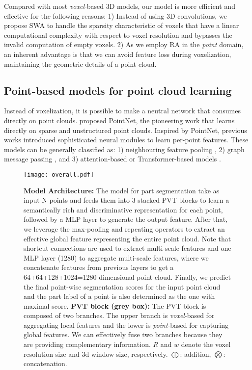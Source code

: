 \documentclass[10pt,twocolumn,letterpaper]{article}
\begin{document}
Compared with most \emph{voxel}-based 3D models, our model is more efficient and effective for the following reasons: 1) Instead of using 3D convolutions, we propose SWA to handle the sparsity characteristic of voxels that have a linear computational complexity with respect to voxel resolution and bypasses the invalid computation of empty voxels. 2) As we employ RA in the \emph{point} domain, an inherent advantage is that we can avoid feature loss during voxelization, maintaining the geometric details of a point cloud.
\subsection{Point-based models for point cloud learning}

Instead of voxelization, it is possible to make a neutral network that consumes directly on point clouds. \cite{qi2017pointnet} proposed PointNet, the pioneering work that learns directly on sparse and unstructured point clouds.
Inspired by PointNet, previous works introduced sophisticated neural modules to learn per-point features. These models can be generally classified as: 1) neighbouring feature pooling \cite{2019PointWeb,2018Recurrent}, 2) graph message passing \cite{2018Dynamic,2019Linked,2019Graph}, and 3) attention-based or Transformer-based models \cite{2021Semantic,2019PCAN,2019Learning,guo2020pct,zhao2020point,Nico}. 
\begin{figure*}
    \centering
    \texttt{[image: overall.pdf]}
    \caption{\textbf{Model Architecture: }The model for part segmentation take as input N points and feeds them into 3 stacked PVT blocks to learn a semantically rich and discriminative representation for each point, followed by a MLP layer to generate the output feature. After that, we leverage the max-pooling and repeating operators to extract an effective global feature representing the entire point cloud. Note that shortcut connections are used to extract multi-scale features and one MLP layer (1280) to aggregate multi-scale features, where we concatenate features from previous layers to get a 64+64+128+1024=1280-dimensional point cloud. Finally, we predict the final point-wise segmentation scores for the input point cloud and the part label of a point is also determined as the one with maximal score.
    \textbf{PVT block (grey box):} The PVT block is composed of two branches. The upper branch is \emph{voxel}-based for aggregating local features and the lower is \emph{point}-based for capturing global features. We can effectively fuse two branches because they are providing complementary information. $R$ and $w$ denote the voxel resolution size and 3d window size, respectively. $\bigoplus$: addition, $\bigotimes$: concatenation.}
    \label{PVTLayer}
\end{figure*} 
\end{document}
